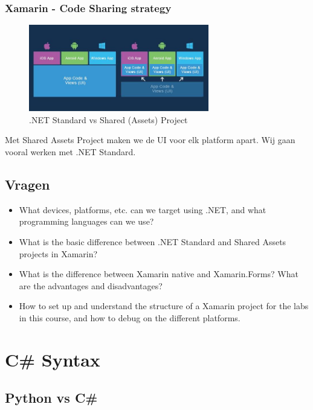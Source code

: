 \documentclass{article}
\begin{document}
\subsubsection{Xamarin - Code Sharing strategy}

\begin{figure}[H]
    \centering
    \includegraphics[width=0.7\textwidth]{xamarin-codesharing.png}
    \caption{.NET Standard vs Shared (Assets) Project}
\end{figure}

Met Shared Assets Project maken we de UI voor elk platform apart. Wij gaan vooral werken met .NET Standard.


\subsection{Vragen}

\begin{itemize}
    \item What devices, platforms, etc. can we target using .NET, and what programming languages can we use?
    \item What is the basic difference between .NET Standard and Shared Assets projects in Xamarin?
    \item What is the difference between Xamarin native and Xamarin.Forms? What are the advantages and disadvantages?
    \item How to set up and understand the structure of a Xamarin project for the labs in this course, and how to debug on the different platforms.
\end{itemize}

\section{C\# Syntax}

\subsection{Python vs C\#}
\end{document}
